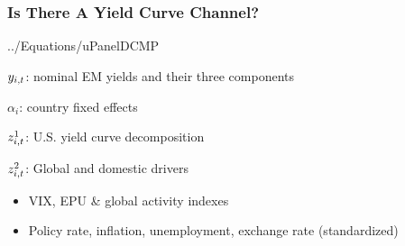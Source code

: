 \documentclass[12pt, aspectratio=169, xcolor=dvipsnames]{beamer}
\begin{document}
\begin{frame}
\frametitle{Is There A Yield Curve Channel?}
 {../Equations/uPanelDCMP}

\(y_{i,t}\): nominal EM yields and their three components

\(\alpha_{i}\): country fixed effects

\(z^{1}_{i,t}\): U.S. yield curve decomposition \citep{KimWright:2005}

\(z^{2}_{i,t}\): Global and domestic drivers
\begin{itemize}
	\item VIX, EPU \citep{BakerBloomDavis:2016} \& global activity  \citep{Hamilton:2019} indexes
	\item Policy rate, inflation, unemployment, exchange rate (standardized) %
\end{itemize}

\end{frame}
\end{document}
